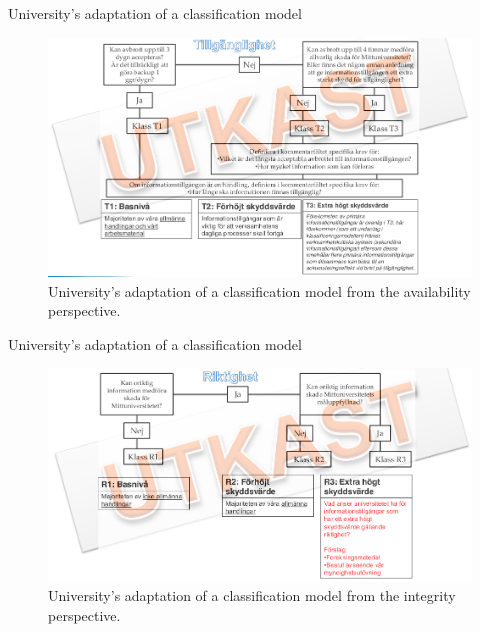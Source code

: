 \documentclass{beamer}
\begin{document}
\begin{frame}{University's adaptation of a classification model}
  \begin{figure}
    \includegraphics[width=\textwidth]{Figures/miun-tillganglighet.png}
    \caption{University's adaptation of a classification model from the
      availability perspective.}
  \end{figure}
\end{frame}

\begin{frame}{University's adaptation of a classification model}
  \begin{figure}
    \includegraphics[width=\textwidth]{Figures/miun-riktighet.png}
    \caption{University's adaptation of a classification model from the
      integrity perspective.}
  \end{figure}
\end{frame}
\end{document}

